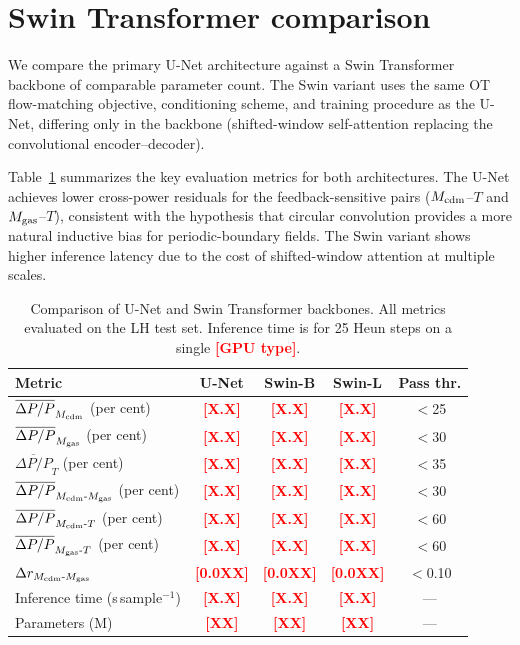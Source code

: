 \documentclass[usenatbib]{mnras}
\newcommand{\FILL}[1]{\textcolor{red}{\textbf{[#1]}}}
\newcommand{\Mcdm}{M_{\rm cdm}}
\newcommand{\Mgas}{M_{\rm gas}}
\newcommand{\Tgas}{T}
\newcommand{\DeltaP}{\Delta P/P}
\begin{document}
\section{Swin Transformer comparison}
\label{app:swin}

We compare the primary U-Net architecture against a Swin Transformer
\citep{Liu2021} backbone of comparable parameter count.
The Swin variant uses the same OT flow-matching objective, conditioning
scheme, and training procedure as the U-Net, differing only in the
backbone (shifted-window self-attention replacing the convolutional
encoder--decoder).

Table~\ref{tab:swin_comparison} summarizes the key evaluation metrics
for both architectures.
The U-Net achieves lower cross-power residuals for the
feedback-sensitive pairs ($\Mcdm$--$\Tgas$ and $\Mgas$--$\Tgas$),
consistent with the hypothesis that circular convolution provides a
more natural inductive bias for periodic-boundary fields.
The Swin variant shows higher inference latency due to the cost of
shifted-window attention at multiple scales.

\begin{table}
  \centering
  \begin{tabular}{lcccc}
    \hline
    Metric & U-Net & Swin-B & Swin-L & Pass thr. \\
    \hline
    $\overline{\DeltaP}_{\Mcdm}$ (per cent)
      & \FILL{X.X} & \FILL{X.X} & \FILL{X.X} & $<$25 \\
    $\overline{\DeltaP}_{\Mgas}$ (per cent)
      & \FILL{X.X} & \FILL{X.X} & \FILL{X.X} & $<$30 \\
    $\overline{\DeltaP}_{\Tgas}$ (per cent)
      & \FILL{X.X} & \FILL{X.X} & \FILL{X.X} & $<$35 \\
    $\overline{\DeltaP}_{\Mcdm\text{-}\Mgas}$ (per cent)
      & \FILL{X.X} & \FILL{X.X} & \FILL{X.X} & $<$30 \\
    $\overline{\DeltaP}_{\Mcdm\text{-}\Tgas}$ (per cent)
      & \FILL{X.X} & \FILL{X.X} & \FILL{X.X} & $<$60 \\
    $\overline{\DeltaP}_{\Mgas\text{-}\Tgas}$ (per cent)
      & \FILL{X.X} & \FILL{X.X} & \FILL{X.X} & $<$60 \\
    $\Delta r_{\Mcdm\text{-}\Mgas}$
      & \FILL{0.0XX} & \FILL{0.0XX} & \FILL{0.0XX} & $<$0.10 \\
    Inference time (s\,sample$^{-1}$)
      & \FILL{X.X} & \FILL{X.X} & \FILL{X.X} & --- \\
    Parameters (M)
      & \FILL{XX} & \FILL{XX} & \FILL{XX} & --- \\
    \hline
  \end{tabular}
  \caption{Comparison of U-Net and Swin Transformer backbones.
    All metrics evaluated on the LH test set.
    Inference time is for 25 Heun steps on a single \FILL{GPU type}.}
  \label{tab:swin_comparison}
\end{table}


\bsp
\label{lastpage}
\end{document}
